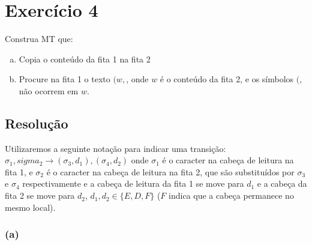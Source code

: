 \documentclass{article}
\begin{document}

\section{Exercício 4}

Construa MT que:

\begin{enumerate}[(a)]
	\item Copia o conteúdo da fita 1 na fita 2
	\item Procure na fita 1 o texto $(w,$, onde $w$ é o conteúdo da fita 2, e os símbolos $(,$ não ocorrem em $w$.
\end{enumerate}

\subsection{Resolução}

Utilizaremos a seguinte notação para indicar uma transição: $\sigma_1,sigma_2\rightarrow (\sigma_3, d_1),(\sigma_4, d_2)$ onde $\sigma_1$ é o caracter na cabeça de leitura na fita 1, e $\sigma_2$ é o caracter na cabeça de leitura na fita 2, que são substituídos por $\sigma_3$ e $\sigma_4$ respectivamente e a cabeça de leitura da fita 1 se move para $d_1$ e a cabeça da fita 2 se move para $d_2$, $d_1, d_2\in\{E,D,F\}$ ($F$ indica que a cabeça permanece no mesmo local).

\subsubsection{(a)}

\begin{center}
\end{center}
\end{document}

